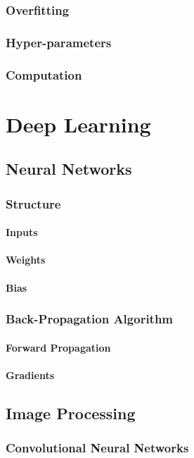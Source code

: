\documentclass{book}
\begin{document}
\begin{appendices}
\subsection{Overfitting}
\subsection{Hyper-parameters}
\subsection{Computation}

\chapter{Deep Learning}
\section{Neural Networks}
\subsection{Structure}
\subsubsection{Inputs}
\subsubsection{Weights}
\subsubsection{Bias}
\subsection{Back-Propagation Algorithm}
\subsubsection{Forward Propagation}
\subsubsection{Gradients}
\section{Image Processing}
\subsection{Convolutional Neural Networks}

\end{appendices}
\end{document}
